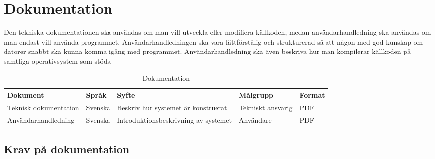 \section{Dokumentation}
Den tekniska dokumentationen ska användas om man vill utveckla eller modifiera källkoden, medan användarhandledning ska användas om man endast vill använda programmet. Användarhandledningen ska vara lättförstålig och strukturerad så att någon med god kunskap om datorer snabbt ska kunna komma igång med programmet. Användarhandledning ska även beskriva hur man kompilerar källkoden på samtliga operativsystem som stöds.
	\begin{table}[h]
	\centering
		\begin{tabularx}{\textwidth}{| l | l | X | l | l |}
			\hline
			\textbf{Dokument} & \textbf{Språk} & \textbf{Syfte} & \textbf{Målgrupp} & \textbf{Format} \\
			\hline
			Teknisk dokumentation & Svenska & Beskriv hur systemet är konstruerat & Tekniskt ansvarig & PDF \\
			\hline
			Användarhandledning & Svenska & Introduktionsbeskrivning av systemet & Användare & PDF \\
			\hline
		\end{tabularx}
	\caption{Dokumentation} \label{dokumentation:tabell}
	\end{table}

\subsection{Krav på dokumentation}
\begin{LIPSkravlista}
\end{LIPSkravlista}
